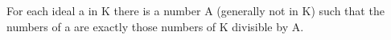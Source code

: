 For each ideal a in K there is a number A (generally not in K) such that the numbers of a are exactly those numbers of K divisible by A.

